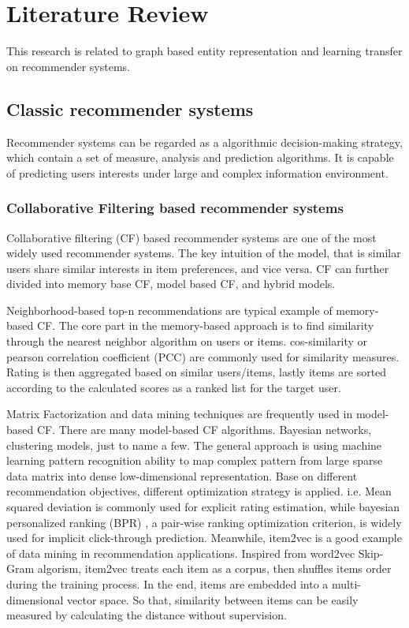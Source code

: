 \section{Literature Review}
This research is related to graph based entity representation and learning transfer on recommender systems.

\subsection{Classic recommender systems}
Recommender systems can be regarded as a algorithmic decision-making strategy, which contain a set of measure, analysis and prediction algorithms. It is capable of predicting users interests under large and complex information environment.

\bigskip
\subsubsection{Collaborative Filtering based recommender systems}
Collaborative filtering (CF) based recommender systems are one of the most widely used recommender systems. The key intuition of the model, that is similar users share similar interests in item preferences, and vice versa. CF can further divided into memory base CF, model based CF, and hybrid models.

Neighborhood-based top-n recommendations are typical example of memory-based CF. The core part in the memory-based approach is to find similarity through the nearest neighbor algorithm on users or items. cos-similarity or pearson correlation coefficient (PCC) \citep{sarwar2001item} are commonly used for similarity measures. Rating is then aggregated based on similar users/items, lastly items are sorted according to the calculated scores as a ranked list for the target user. 

Matrix Factorization and data mining techniques are frequently used in model-based CF. There are many model-based CF algorithms. Bayesian networks, clustering models, just to name a few. The general approach is using machine learning pattern recognition ability to map complex pattern from large sparse data matrix into dense low-dimensional representation. Base on different recommendation objectives, different optimization strategy is applied. i.e. Mean squared deviation is commonly used for explicit rating estimation, while bayesian personalized ranking (BPR) \citep{rendle2012bpr}, a pair-wise ranking optimization criterion, is widely used for implicit click-through prediction.   
Meanwhile, item2vec \citep{barkan2016item2vec} is a good example of data mining in recommendation applications. Inspired from word2vec \citep{mikolov2013distributed} Skip-Gram algorism, item2vec treats each item as a corpus, then shuffles items order during the training process. In the end, items are embedded into a multi-dimensional vector space. So that, similarity between items can be easily measured by calculating the distance without supervision.  

